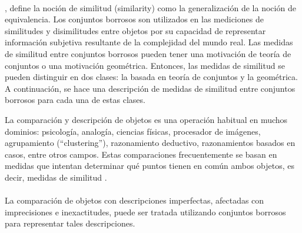 \\
\citet{zadeh1971similarity}, define la noción de similitud (similarity) como la generalización de la noción de equivalencia. Los conjuntos borrosos son utilizados en las mediciones de similitudes y disimilitudes entre objetos por su capacidad de representar información subjetiva resultante de la complejidad del mundo real. Las medidas de similitud entre conjuntos borrosos pueden tener una motivación de teoría de conjuntos o una motivación geométrica. Entonces, las medidas de similitud se pueden distinguir en dos clases: la basada en teoría de conjuntos y la geométrica.
A continuación, se hace una descripción de medidas de similitud entre conjuntos borrosos para cada una de estas clases.

La comparación y descripción de objetos es una operación habitual en muchos dominios: psicología, analogía, ciencias físicas, procesador de imágenes, agrupamiento (``clustering''), razonamiento deductivo, razonamientos basados en casos, entre otros campos. Estas comparaciones frecuentemente se basan en medidas que intentan determinar qué puntos tienen en común ambos objetos, es decir, medidas de similitud \cite[]{bouchon2008similarities}.\\
\\
La comparación de objetos con descripciones imperfectas, afectadas con imprecisiones e inexactitudes, puede ser tratada utilizando conjuntos borrosos para representar tales descripciones.

